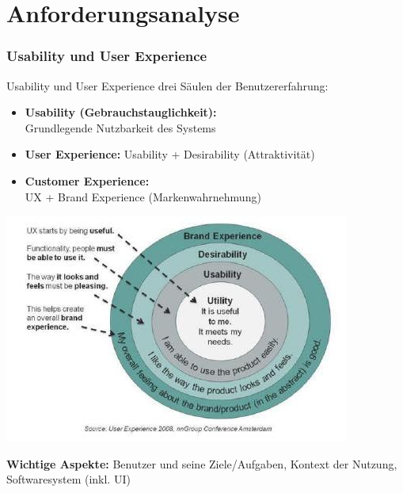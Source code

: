\section{Anforderungsanalyse}


\subsubsection{Usability und User Experience}

\begin{concept}{Usability und User Experience} drei Säulen der Benutzererfahrung:
\begin{itemize}
    \item \textbf{Usability (Gebrauchstauglichkeit):} \\ Grundlegende Nutzbarkeit des Systems
    \item \textbf{User Experience:} Usability + Desirability (Attraktivität)
    \item \textbf{Customer Experience:} \\ UX + Brand Experience (Markenwahrnehmung)
\end{itemize}
\includegraphics[width=0.6\linewidth]{images/2024_12_29_0d1d7b5551ea1b4b41bdg-02}

\textbf{Wichtige Aspekte:}
Benutzer und seine Ziele/Aufgaben, Kontext der Nutzung, Softwaresystem (inkl. UI)
\end{concept}


